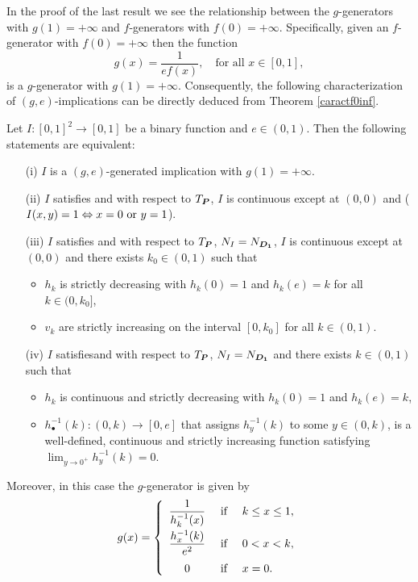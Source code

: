 In the proof of the last result we see the relationship between the $g$-generators with $g(1)=+\infty$ and $f$-generators with $f(0)=+\infty$. Specifically, given an $f$-generator with $f(0)=+\infty$ then the function
$$g(x)=\frac{1}{ef(x)}, \quad \text{for all } x \in [0,1],$$
is a $g$-generator with $g(1)=+\infty$. Consequently, the following characterization of $(g,e)$-implications can be directly deduced from Theorem \ref{caractf0inf}.

\begin{theorem}\label{caractg1fin}
	Let $I:[0,1]^2\to [0,1]$ be a binary function and $e\in(0,1)$. Then the following statements are equivalent:
	\begin{enumerate}
		\item[(i)] $I$ is a $(g,e)$-generated implication with $g(1)=+\infty$.
		\item[(ii)] $I$ satisfies \LIey and \LIex with respect to $T_{\bm{P}}$, $I$ is continuous except at $(0,0)$ and ($I(x,y)=1 \Leftrightarrow x=0 \hbox{ or } y=1$). 
		\item[(iii)] $I$ satisfies \LIey and \LIex with respect to $T_{\bm{P}}$, $N_I=N_{\bm{D_1}}$, $I$ is continuous except at $(0,0)$ and there exists $k_0\in(0,1)$ such that 
		\begin{itemize}
			\item $h_k$ is strictly decreasing with $h_k(0)=1$ and $h_k(e)=k$ for all $k\in(0,k_0]$,
			\item $v_k$ are strictly increasing on the interval $[0,k_0]$ for all $k\in(0,1)$.
		\end{itemize}
		\item[(iv)] $I$ satisfies\LIey and \LIex with respect to $T_{\bm{P}}$, $N_I=N_{\bm{D_1}}$ and there exists $k\in(0,1)$ such that 
		\begin{itemize}
			\item $h_k$ is continuous and strictly decreasing with $h_k(0)=1$ and $h_k(e)=k$,
			\item $h_{\bullet}^{-1}(k):(0,k)\to[0,e]$ that assigns $h_y^{-1}(k)$ to some $y\in(0,k)$, is a well-defined, continuous and strictly increasing function satisfying 
			$\displaystyle \lim_{y\to 0^+}{h_y^{-1}(k)}=0$. 
		\end{itemize}
	\end{enumerate}
	Moreover, in this case the $g$-generator is given by
	\begin{equation}
		\label{ggen}
		g(x)=\left\{\begin{array}{ccl} \dfrac{1}{h_k^{-1}(x)} &\hbox{ if }& k\leq x \leq 1,\\[1em] \dfrac{h_x^{-1}(k)}{e^2}&\hbox{ if }& 0<x<k,\\[1em] 0 &\hbox{ if }& x=0.\end{array}\right.
	\end{equation}
\end{theorem}


